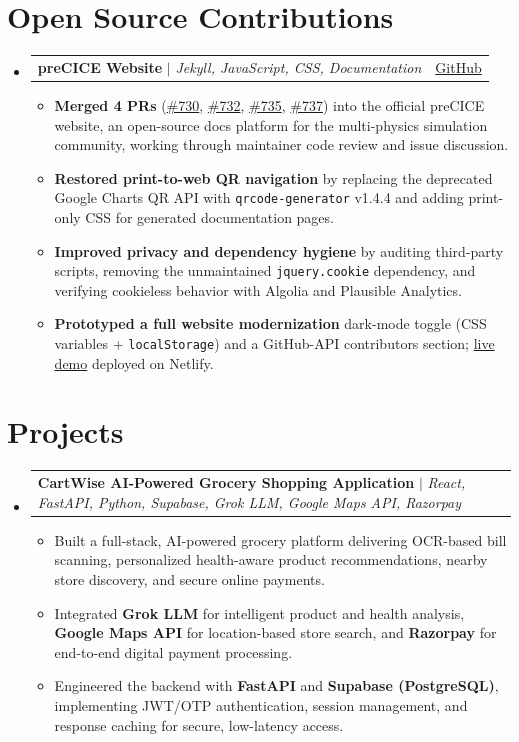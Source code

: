 \documentclass[letterpaper,11pt]{article}
\makeatletter
\newcommand{\resumeItem}[1]{
  \item\small{
        {#1 \vspace{-1pt}}
  }
}
\newcommand{\resumeProjectHeading}[2]{
        \item
        \begin{tabular*}{0.97\textwidth}{l@{\extracolsep{\fill}}r}
        \small#1 & #2 \\
                \end{tabular*}\vspace{-6pt}
}
\newcommand{\resumeSubHeadingListStart}{\begin{itemize}[leftmargin=0.15in, label={}, itemsep=2pt, parsep=0pt]}
\newcommand{\resumeSubHeadingListEnd}{\end{itemize}}
\newcommand{\resumeItemListStart}{\begin{itemize}[leftmargin=0.18in, itemsep=2pt, parsep=0pt]}
\newcommand{\resumeItemListEnd}{\end{itemize}\vspace{-4pt}}
\makeatother
\begin{document}
\section{Open Source Contributions}
\resumeSubHeadingListStart
  \resumeProjectHeading
    {\textbf{preCICE Website} $|$ \emph{Jekyll, JavaScript, CSS, Documentation}}{\href{https://github.com/precice/precice.github.io}{GitHub}}
    \resumeItemListStart
      \resumeItem{\textbf{Merged 4 PRs} (\href{https://github.com/precice/precice.github.io/pull/730}{\#730}, \href{https://github.com/precice/precice.github.io/pull/732}{\#732}, \href{https://github.com/precice/precice.github.io/pull/735}{\#735}, \href{https://github.com/precice/precice.github.io/pull/737}{\#737}) into the official preCICE website, an open-source docs platform for the multi-physics simulation community, working through maintainer code review and issue discussion.}
      \resumeItem{\textbf{Restored print-to-web QR navigation} by replacing the deprecated Google Charts QR API with \texttt{qrcode-generator} v1.4.4 and adding print-only CSS for generated documentation pages.}
      \resumeItem{\textbf{Improved privacy and dependency hygiene} by auditing third-party scripts, removing the unmaintained \texttt{jquery.cookie} dependency, and verifying cookieless behavior with Algolia and Plausible Analytics.}
      \resumeItem{\textbf{Prototyped a full website modernization} \textemdash{} dark-mode toggle (CSS variables + \texttt{localStorage}) and a GitHub-API contributors section; \href{https://precice-modernized.netlify.app/}{live demo} deployed on Netlify.}
    \resumeItemListEnd
\resumeSubHeadingListEnd

\section{Projects}
    \resumeSubHeadingListStart
      \resumeProjectHeading
        {\textbf{CartWise \textemdash{} AI-Powered Grocery Shopping Application} $|$ \emph{React, FastAPI, Python, Supabase, Grok LLM, Google Maps API, Razorpay}}{}
        \resumeItemListStart
          \resumeItem{Built a full-stack, AI-powered grocery platform delivering OCR-based bill scanning, personalized health-aware product recommendations, nearby store discovery, and secure online payments.}
          \resumeItem{Integrated \textbf{Grok LLM} for intelligent product and health analysis, \textbf{Google Maps API} for location-based store search, and \textbf{Razorpay} for end-to-end digital payment processing.}
          \resumeItem{Engineered the backend with \textbf{FastAPI} and \textbf{Supabase (PostgreSQL)}, implementing JWT/OTP authentication, session management, and response caching for secure, low-latency access.}
        \resumeItemListEnd
    \resumeSubHeadingListEnd
\end{document}

